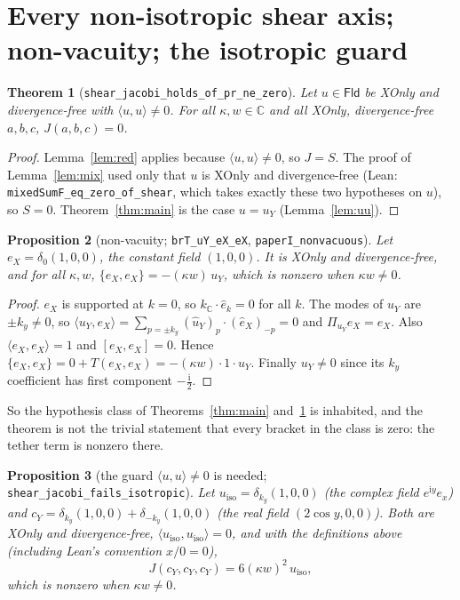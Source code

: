 \documentclass[11pt]{article}\emergencystretch=2em
\newtheorem{theorem}{Theorem}\newtheorem{lemma}[theorem]{Lemma}\newtheorem{proposition}[theorem]{Proposition}
\theoremstyle{definition}\newtheorem{definition}[theorem]{Definition}\theoremstyle{remark}\newtheorem{remark}[theorem]{Remark}
\newcommand{\Fld}{\mathsf{Fld}}\newcommand{\br}[2]{[#1,#2]}\newcommand{\pr}[2]{\langle #1,#2\rangle}
\newcommand{\ii}{\mathrm{i}}
\begin{document}
\section{Every non-isotropic shear axis; non-vacuity; the isotropic guard}
\begin{theorem}[\texttt{shear\_jacobi\_holds\_of\_pr\_ne\_zero}]\label{thm:gen}
Let $u\in\Fld$ be XOnly and divergence-free with $\pr uu\ne0$. For all $\kappa,w\in\mathbb C$ and all XOnly, divergence-free $a,b,c$, $J(a,b,c)=0$.
\end{theorem}
\begin{proof}
Lemma~\ref{lem:red} applies because $\pr uu\ne0$, so $J=S$. The proof of Lemma~\ref{lem:mix} used only that $u$ is XOnly and divergence-free (Lean: \texttt{mixedSumF\_eq\_zero\_of\_shear}, which takes exactly these two hypotheses on $u$), so $S=0$. Theorem~\ref{thm:main} is the case $u=u_Y$ (Lemma~\ref{lem:uu}).
\end{proof}
\begin{proposition}[non-vacuity; \texttt{brT\_uY\_eX\_eX}, \texttt{paperI\_nonvacuous}]\label{prop:nonvac}
Let $e_X=\delta_0(1,0,0)$, the constant field $(1,0,0)$. It is XOnly and divergence-free, and for all $\kappa,w$, $\{e_X,e_X\}=-(\kappa w)\,u_Y$, which is nonzero when $\kappa w\ne0$.
\end{proposition}
\begin{proof}
$e_X$ is supported at $k=0$, so $k_{\mathbb C}\cdot\hat e_k=0$ for all $k$. The modes of $u_Y$ are $\pm k_y\ne0$, so $\pr{u_Y}{e_X}=\sum_{p=\pm k_y}(\hat u_Y)_p\cdot(\hat e_X)_{-p}=0$ and $\Pi_{u_Y}e_X=e_X$. Also $\pr{e_X}{e_X}=1$ and $\br{e_X}{e_X}=0$. Hence $\{e_X,e_X\}=0+T(e_X,e_X)=-(\kappa w)\cdot1\cdot u_Y$. Finally $u_Y\ne0$ since its $k_y$ coefficient has first component $-\tfrac{\ii}2$.
\end{proof}
So the hypothesis class of Theorems~\ref{thm:main} and~\ref{thm:gen} is inhabited, and the theorem is not the trivial statement that every bracket in the class is zero: the tether term is nonzero there.
\begin{proposition}[the guard $\pr uu\ne0$ is needed; \texttt{shear\_jacobi\_fails\_isotropic}]\label{prop:iso}
Let $u_{\mathrm{iso}}=\delta_{k_y}(1,0,0)$ (the complex field $e^{\ii y}e_x$) and $c_Y=\delta_{k_y}(1,0,0)+\delta_{-k_y}(1,0,0)$ (the real field $(2\cos y,0,0)$). Both are XOnly and divergence-free, $\pr{u_{\mathrm{iso}}}{u_{\mathrm{iso}}}=0$, and with the definitions above (including Lean's convention $x/0=0$),
\[J(c_Y,c_Y,c_Y)=6(\kappa w)^2\,u_{\mathrm{iso}},\]
which is nonzero when $\kappa w\ne0$.
\end{proposition}
\end{document}
